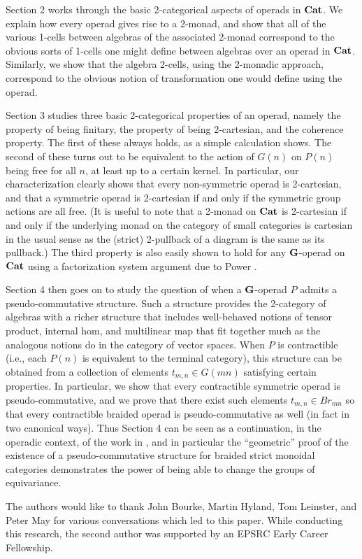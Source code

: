 Section 2 works through the basic 2-categorical aspects of operads in $\mathbf{Cat}$.  We explain how every operad gives rise to a 2-monad, and show that all of the various 1-cells between algebras of the associated 2-monad correspond to the obvious sorts of 1-cells one might define between algebras over an operad in $\mathbf{Cat}$.  Similarly, we show that the algebra 2-cells, using the 2-monadic approach, correspond to the obvious notion of transformation one would define using the operad.

Section 3 studies three basic 2-categorical properties of an operad, namely the property of being finitary, the property of being 2-cartesian, and the coherence property.  The first of these always holds, as a simple calculation shows.  The second of these turns out to be equivalent to the action of $G(n)$ on $P(n)$ being free for all $n$, at least up to a certain kernel.  In particular, our characterization clearly shows that every non-symmetric operad is 2-cartesian, and that a symmetric operad is 2-cartesian if and only if the symmetric group actions are all free.  (It is useful to note that a 2-monad on $\mathbf{Cat}$ is 2-cartesian if and only if the underlying monad on the category of small categories is cartesian in the usual sense as the (strict) 2-pullback of a diagram is the same as its pullback.)  The third property is also easily shown to hold for any $\mathbf{G}$-operad on $\mathbf{Cat}$ using a factorization system argument due to Power \cite{power-gen}.

Section 4 then goes on to study the question of when a $\mathbf{G}$-operad $P$ admits a pseudo-commutative structure.  Such a structure provides the 2-category of algebras with a richer structure that includes well-behaved notions of tensor product, internal hom, and multilinear map that fit together much as the analogous notions do in the category of vector spaces.  When $P$ is contractible (i.e., each $P(n)$ is equivalent to the terminal category), this structure can be obtained from a collection of elements $t_{m,n} \in G(mn)$ satisfying certain properties.  In particular, we show that every contractible symmetric operad is pseudo-commutative, and we prove that there exist such elements $t_{m,n} \in Br_{mn}$ so that every contractible braided operad is pseudo-commutative as well (in fact in two canonical ways).  Thus Section 4 can be seen as a continuation, in the operadic context, of the work in \cite{HP}, and in particular the ``geometric'' proof of the existence of a pseudo-commutative structure for braided strict monoidal categories demonstrates the power of being able to change the groups of equivariance.

The authors would like to thank John Bourke, Martin Hyland, Tom Leinster, and Peter May for various conversations which led to this paper.  While conducting this research, the second author was supported by an EPSRC Early Career Fellowship. 